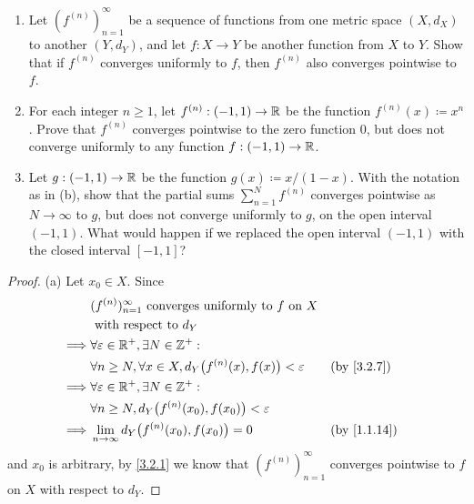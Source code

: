 \begin{ex}\label{ex:3.2.2}
  \quad
  \begin{enumerate}
    \item Let \((f^{(n)})_{n = 1}^\infty\) be a sequence of functions from one metric space \((X, d_X)\) to another \((Y, d_Y)\), and let \(f : X \to Y\) be another function from \(X\) to \(Y\).
          Show that if \(f^{(n)}\) converges uniformly to \(f\), then \(f^{(n)}\) also converges pointwise to \(f\).
    \item For each integer \(n \geq 1\), let \(f^{(n)} : (-1, 1) \to \mathbb{R}\) be the function \(f^{(n)}(x) \coloneqq x^n\).
          Prove that \(f^{(n)}\) converges pointwise to the zero function \(0\), but does not converge uniformly to any function \(f : (-1, 1) \to \mathbb{R}\).
    \item Let \(g : (-1, 1) \to \mathbb{R}\) be the function \(g(x) \coloneqq x / (1 - x)\).
          With the notation as in (b), show that the partial sums \(\sum_{n = 1}^N f^{(n)}\) converges pointwise as \(N \to \infty\) to \(g\), but does not converge uniformly to \(g\), on the open interval \((-1, 1)\).
          What would happen if we replaced the open interval \((-1, 1)\) with the closed interval \([-1, 1]\)?
  \end{enumerate}
\end{ex}

\begin{proof}{(a)}
  Let \(x_0 \in X\).
  Since
  \begin{align*}
             & (f^{(n)})_{n = 1}^\infty \text{ converges uniformly to } f \text{ on } X                        \\
             & \text{ with respect to } d_Y                                                                    \\
    \implies & \forall \varepsilon \in \R^+, \exists N \in \Z^+ :                                              \\
             & \forall n \geq N, \forall x \in X, d_Y\big(f^{(n)}(x), f(x)\big) < \varepsilon &  & \by{3.2.7}  \\
    \implies & \forall \varepsilon \in \R^+, \exists N \in \Z^+ :                                              \\
             & \forall n \geq N, d_Y\big(f^{(n)}(x_0), f(x_0)\big) < \varepsilon                               \\
    \implies & \lim_{n \to \infty} d_Y\big(f^{(n)}(x_0), f(x_0)\big) = 0                      &  & \by{1.1.14}
  \end{align*}
  and \(x_0\) is arbitrary, by \cref{3.2.1} we know that \((f^{(n)})_{n = 1}^\infty\) converges pointwise to \(f\) on \(X\) with respect to \(d_Y\).
\end{proof}

